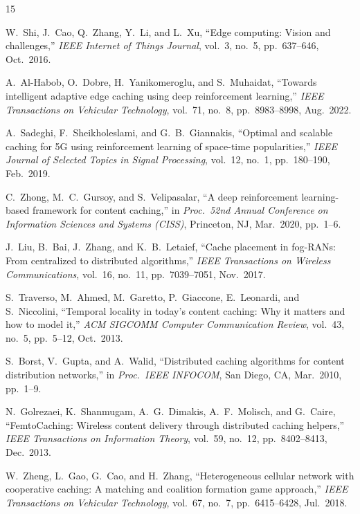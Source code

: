 \documentclass[conference]{IEEEtran}
\begin{document}
\begin{thebibliography}{15}

W.~Shi, J.~Cao, Q.~Zhang, Y.~Li, and L.~Xu,
``Edge computing: Vision and challenges,''
\emph{IEEE Internet of Things Journal}, vol.~3, no.~5, pp.~637--646, Oct.\ 2016.

A.~Al-Habob, O.~Dobre, H.~Yanikomeroglu, and S.~Muhaidat,
``Towards intelligent adaptive edge caching using deep reinforcement
learning,''
\emph{IEEE Transactions on Vehicular Technology}, vol.~71, no.~8, pp.~8983--8998, Aug.\ 2022.

A.~Sadeghi, F.~Sheikholeslami, and G.~B.~Giannakis,
``Optimal and scalable caching for 5G using reinforcement learning of
space-time popularities,''
\emph{IEEE Journal of Selected Topics in Signal Processing},
vol.~12, no.~1, pp.~180--190, Feb.\ 2019.

C.~Zhong, M.~C.~Gursoy, and S.~Velipasalar,
``A deep reinforcement learning-based framework for content caching,''
in \emph{Proc.\ 52nd Annual Conference on Information Sciences and
Systems (CISS)}, Princeton, NJ, Mar.\ 2020, pp.~1--6.

J.~Liu, B.~Bai, J.~Zhang, and K.~B.~Letaief,
``Cache placement in fog-RANs: From centralized to distributed
algorithms,''
\emph{IEEE Transactions on Wireless Communications}, vol.~16, no.~11,
pp.~7039--7051, Nov.\ 2017.

S.~Traverso, M.~Ahmed, M.~Garetto, P.~Giaccone, E.~Leonardi, and
S.~Niccolini,
``Temporal locality in today's content caching: Why it matters and how
to model it,''
\emph{ACM SIGCOMM Computer Communication Review}, vol.~43, no.~5,
pp.~5--12, Oct.\ 2013.

S.~Borst, V.~Gupta, and A.~Walid,
``Distributed caching algorithms for content distribution networks,''
in \emph{Proc.\ IEEE INFOCOM}, San Diego, CA, Mar.\ 2010, pp.~1--9.

N.~Golrezaei, K.~Shanmugam, A.~G.~Dimakis, A.~F.~Molisch, and
G.~Caire,
``FemtoCaching: Wireless content delivery through distributed caching
helpers,''
\emph{IEEE Transactions on Information Theory}, vol.~59, no.~12,
pp.~8402--8413, Dec.\ 2013.

W.~Zheng, L.~Gao, G.~Cao, and H.~Zhang,
``Heterogeneous cellular network with cooperative caching: A matching
and coalition formation game approach,''
\emph{IEEE Transactions on Vehicular Technology}, vol.~67, no.~7,
pp.~6415--6428, Jul.\ 2018.


\end{thebibliography}
\end{document}

